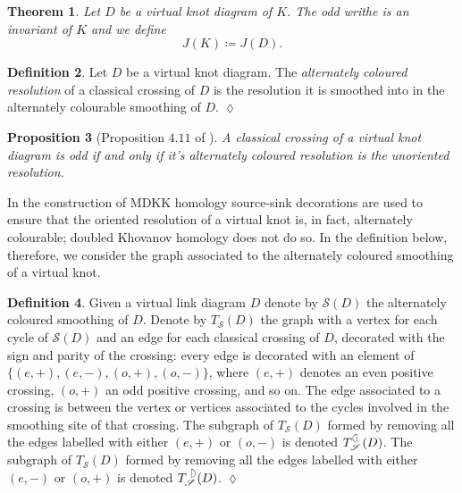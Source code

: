 \documentclass[10pt,oneside]{amsart}
\newtheorem{theorem}{Theorem}[section]
\newtheorem{proposition}[theorem]{Proposition}
\theoremstyle{definition}
\newtheorem{definition}[theorem]{Definition}
\numberwithin{equation}{section}
\DeclareRobustCommand{\CloseDef}{	\leavevmode\unskip\penalty9999 \hbox{}\nobreak\hfill
	\quad\hbox{$\lozenge$}}
\begin{document}
\begin{theorem}
	Let \( D \) be a virtual knot diagram of \(K\). The odd writhe is an invariant of \( K \) and we define
	\begin{equation*}
	J ( K ) \coloneqq J ( D ).
	\end{equation*}
\end{theorem}

\begin{definition}
	\label{Def:acres}
	Let \( D \) be a virtual knot diagram. The \emph{alternately coloured resolution} of a classical crossing of \( D \) is the resolution it is smoothed into in the alternately colourable smoothing of \( D \).\CloseDef
\end{definition}

\begin{proposition}[Proposition \(4.11\) of \cite{Rushworth2017}]\label{Prop:unoriented}
	A classical crossing of a virtual knot diagram is odd if and only if it's alternately coloured resolution is the unoriented resolution.
\end{proposition}

In the construction of MDKK homology source-sink decorations are used to ensure that the oriented resolution of a virtual knot is, in fact, alternately colourable; doubled Khovanov homology does not do so. In the definition below, therefore, we consider the graph associated to the alternately coloured smoothing of a virtual knot.

\begin{definition}
	\label{Seifertgraph2}
	Given a virtual link diagram \( D \) denote by \( \mathscr{S} ( D ) \) the alternately coloured smoothing of \( D \). Denote by \( T_{\mathscr{S}} ( D ) \) the graph with a vertex for each cycle of \( \mathscr{S} ( D ) \) and an edge for each classical crossing of \( D \), decorated with the sign and parity of the crossing: every edge is decorated with an element of \( \lbrace (e,+),(e,-),(o,+),(o,-) \rbrace \), where \( (e,+) \) denotes an even positive crossing, \( (o,+) \) an odd positive crossing, and so on. The edge associated to a crossing is between the vertex or vertices associated to the cycles involved in the smoothing site of that crossing. The subgraph of \( T_{\mathscr{S}} ( D ) \) formed by removing all the edges labelled with either \( (e,+) \) or \( (o,-) \) is denoted \( T^{\Leftcircle}_{\mathscr{S}} ( D ) \). The subgraph of \( T_{\mathscr{S}} ( D ) \) formed by removing all the edges labelled with either \( (e,-) \) or \( (o,+) \) is denoted \( T^{\Rightcircle}_{\mathscr{S}} ( D ) \).\CloseDef
\end{definition}
\end{document}
